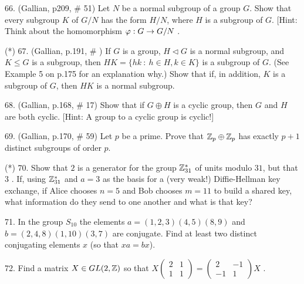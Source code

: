 \documentclass[12pt]{article}
\begin{document}
\begin{description}

\item{66.} (Gallian, p209, \# 51) Let $N$ be a normal subgroup of a group $G$. 
Show that every subgroup $K$ of $G/N$ has the form
$H/N$, where $H$ is a subgroup of $G$. [Hint: Think about the homomorphism
$\varphi:G\rightarrow G/N$ .

\msk

\item{(*) 67.} (Gallian, p.191, \# ) If $G$ is a group, $H\lhd G$ is a normal subgroup, and 
$K\leq G$ is a subgroup, then $HK=\{hk\ :\ h\in H, k\in K\}$ is a subgroup of $G$.
(See Example 5 on p.175 for an explanation why.) Show that if, in addition, $K$ is a 
subgroup of $G$, then $HK$ is a normal subgroup.

\msk

\item{68.} (Gallian, p.168, \# 17) Show that if
$G\oplus H$ is a cyclic group, then $G$ and $H$ are
both cyclic. [Hint: A group 
to a cyclic group is cyclic!]

\msk

\item{69.} (Gallian, p.170, \# 59) Let $p$ be a prime. Prove that ${\mathbb Z}_p\oplus {\mathbb Z}_p$ has exactly $p+1$
distinct subgroups of order $p$.

\msk

\item{(*) 70.} Show that $2$ is  a generator for the group ${\mathbb Z}_{31}^*$ of units 
modulo $31$, but that $3$ . If, using ${\mathbb Z}_{31}^*$ and $a=3$ as the basis for a 
(very weak!) Diffie-Hellman key exchange, if Alice chooses $n=5$ and Bob chooses $m=11$ 
to build a shared key, what information do they send to one another and what is that key?

\msk

\item{71.} In the group $S_{10}$ the elements $a=(1,2,3)(4,5)(8,9)$ and $b=(2,4,8)(1,10)(3,7)$
are conjugate. Find at least two distinct conjugating elements $x$ (so that
$xa=bx$).

\msk

\item{72.} Find a matrix $X\in GL(2,{\mathbb Z})$ so that 
$X\left(\begin{array}{cc} 2 & 1 \\ 1 & 1 \end{array}\right) = \left(\begin{array}{cc} 2 & -1 \\ -1 & 1 \end{array}\right)X$ .


\end{description}
\end{document}
